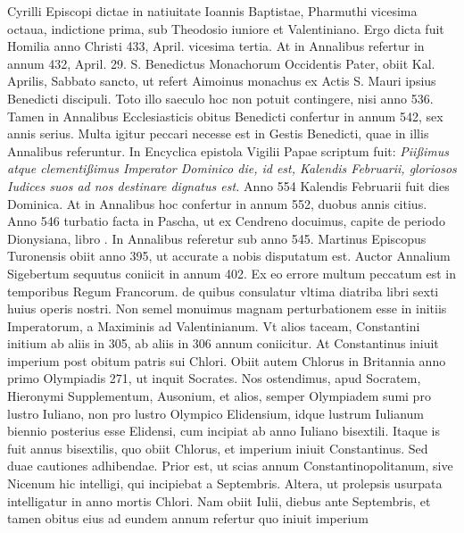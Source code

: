 Cyrilli Episcopi dictae in natiuitate Ioannis Baptistae, Pharmuthi
vicesima octaua, indictione prima, sub Theodosio iuniore et Valentiniano.
Ergo dicta fuit Homilia anno Christi 433, April. vicesima
tertia.
At in Annalibus refertur in annum 432, April. 29. S. Benedictus
Monachorum Occidentis Pater, obiit  Kal. Aprilis, Sabbato
sancto, ut refert Aimoinus monachus ex Actis S. Mauri ipsius
Benedicti discipuli.
Toto illo saeculo hoc non potuit contingere, nisi
anno 536.
Tamen in Annalibus Ecclesiasticis obitus Benedicti confertur
in annum 542, sex annis serius.
%
Multa igitur peccari necesse est
in Gestis Benedicti, quae in illis Annalibus referuntur.
In Encyclica
epistola Vigilii Papae scriptum fuit: \textit{Piißimus atque clementißimus
Imperator Dominico die, id est, Kalendis Februarii, gloriosos Iudices suos
ad nos destinare dignatus est.}
Anno 554 Kalendis Februarii fuit dies
Dominica.
At in Annalibus hoc confertur in annum 552, duobus
annis citius.
Anno 546 turbatio facta in Pascha, ut ex Cendreno docuimus,
capite de periodo Dionysiana, libro .
In Annalibus referetur
sub anno 545.
Martinus Episcopus Turonensis obiit anno
395, ut accurate a nobis disputatum est.
Auctor Annalium Sigebertum
sequutus coniicit in annum 402.
Ex eo errore multum peccatum
est in temporibus Regum Francorum.
de quibus consulatur vltima
diatriba libri sexti huius operis nostri.
Non semel monuimus magnam
perturbationem esse in initiis Imperatorum, a Maximinis
ad Valentinianum.
Vt alios taceam, Constantini initium ab aliis in
305, ab aliis in 306 annum coniicitur.
At Constantinus iniuit imperium
post obitum patris sui Chlori.
Obiit autem Chlorus in Britannia
anno primo Olympiadis 271, ut inquit Socrates.
Nos ostendimus,
apud Socratem, Hieronymi Supplementum, Ausonium, et alios,
semper Olympiadem sumi pro lustro Iuliano, non pro lustro Olympico
Elidensium, idque lustrum Iulianum biennio posterius esse Elidensi,
cum incipiat ab anno Iuliano bisextili.
Itaque is fuit annus bisextilis,
quo obiit Chlorus, et imperium iniuit Constantinus.
Sed duae
cautiones adhibendae.
Prior est, ut scias annum Constantinopolitanum,
sive Nicenum hic intelligi, qui incipiebat a  Septembris.
Altera, ut prolepsis usurpata intelligatur in anno mortis Chlori.
Nam obiit  Iulii,  diebus ante
 Septembris, et
tamen obitus eius ad eundem annum refertur quo iniuit imperium
